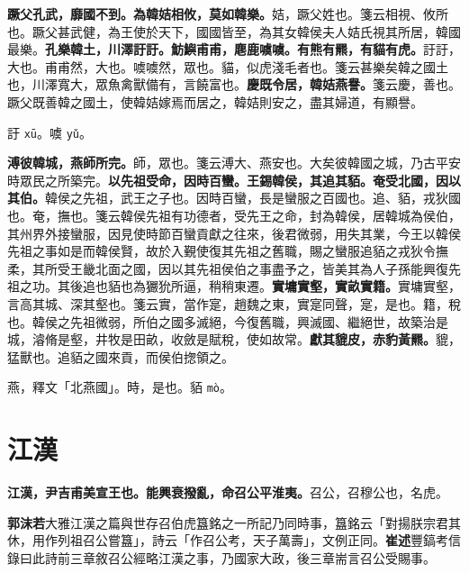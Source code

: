 \textbf{蹶父孔武，靡國不到。為韓姞相攸，莫如韓樂。}{\footnotesize 姞，蹶父姓也。箋云相視、攸所也。蹶父甚武健，為王使於天下，國國皆至，為其女韓侯夫人姞氏視其所居，韓國最樂。}\textbf{孔樂韓土，川澤訏訏。魴鱮甫甫，麀鹿噳噳。有熊有羆，有貓有虎。}{\footnotesize 訏訏，大也。甫甫然，大也。噳噳然，眾也。貓，似虎淺毛者也。箋云甚樂矣韓之國土也，川澤寬大，眾魚禽獸備有，言饒富也。}\textbf{慶既令居，韓姞燕譽。}{\footnotesize 箋云慶，善也。蹶父既善韓之國土，使韓姞嫁焉而居之，韓姞則安之，盡其婦道，有顯譽。}

\begin{quoting}訏 \texttt{xū}。噳 \texttt{yǔ}。\end{quoting}

\textbf{溥彼韓城，燕師所完。}{\footnotesize 師，眾也。箋云溥大、燕安也。大矣彼韓國之城，乃古平安時眾民之所築完。}\textbf{以先祖受命，因時百蠻。王錫韓侯，其追其貊。奄受北國，因以其伯。}{\footnotesize 韓侯之先祖，武王之子也。因時百蠻，長是蠻服之百國也。追、貊，戎狄國也。奄，撫也。箋云韓侯先祖有功德者，受先王之命，封為韓侯，居韓城為侯伯，其州界外接蠻服，因見使時節百蠻貢獻之往來，後君微弱，用失其業，今王以韓侯先祖之事如是而韓侯賢，故於入覲使復其先祖之舊職，賜之蠻服追貊之戎狄令撫柔，其所受王畿北面之國，因以其先祖侯伯之事盡予之，皆美其為人子孫能興復先祖之功。其後追也貊也為玁狁所逼，稍稍東遷。}\textbf{實墉實壑，實畝實籍。}{\footnotesize 實墉實壑，言高其城、深其壑也。箋云實，當作寔，趙魏之東，實寔同聲，寔，是也。籍，稅也。韓侯之先祖微弱，所伯之國多滅絕，今復舊職，興滅國、繼絕世，故築治是城，濬脩是壑，井牧是田畝，收斂是賦稅，使如故常。}\textbf{獻其貔皮，赤豹黃羆。}{\footnotesize 貔，猛獸也。追貊之國來貢，而侯伯揔領之。}

\begin{quoting}燕，釋文「北燕國」。時，是也。貊 \texttt{mò}。\end{quoting}

\section{江漢}


\textbf{江漢，尹吉甫美宣王也。能興衰撥亂，命召公平淮夷。}{\footnotesize 召公，召穆公也，名虎。}

\begin{quoting}\textbf{郭沫若}大雅江漢之篇與世存召伯虎簋銘之一所記乃同時事，簋銘云「對揚朕宗君其休，用作列祖召公嘗簋」，詩云「作召公考，天子萬壽」，文例正同。\textbf{崔述}豐鎬考信錄曰此詩前三章敘召公經略江漢之事，乃國家大政，後三章耑言召公受賜事。\end{quoting}

